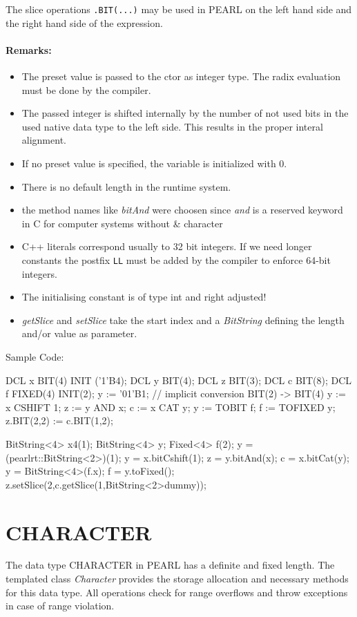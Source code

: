 The slice operations \verb|.BIT(...)| may be used in PEARL 
on the left hand side and the right hand side of the expression.
 

\paragraph{Remarks:}
\begin{itemize}
\item The preset value is passed to the ctor as integer type. The
   radix evaluation must be done by the compiler.
\item The passed integer is shifted internally by the number of not used 
   bits in the used native data type to the left side. This results
   in the proper interal alignment.
\item If no preset value is specified, the variable is initialized with 0.
\item There is no default length in the runtime system.
\item the method names like {\em bitAnd} were choosen since {\em and} 
is a reserved keyword in C for computer systems without \& character
\item C++ literals correspond usually to 32 bit integers. 
If we need longer constants the postfix \verb|LL| must be added by
the compiler to enforce 64-bit integers.
\item The initialising constant is of type int and right adjusted!
\item {\em getSlice} and {\em setSlice} take the start index and a 
    {\em BitString} defining the length and/or value as parameter.
\end{itemize}

Sample Code:
\begin{PEARLCode}
DCL x BIT(4) INIT ('1'B4);
DCL y BIT(4);
DCL z BIT(3);
DCL c BIT(8);
DCL f FIXED(4) INIT(2);
y := '01'B1;  // implicit conversion BIT(2) -> BIT(4)
y := x CSHIFT 1;
z := y AND x;
c := x CAT y;
y := TOBIT f;
f := TOFIXED y;
z.BIT(2,2)  := c.BIT(1,2);
\end{PEARLCode}

\begin{CppCode}
BitString<4> x4(1);
BitString<4> y;
Fixed<4> f(2);
y = (pearlrt::BitString<2>)(1);
y = x.bitCshift(1);
z = y.bitAnd(x);
c = x.bitCat(y);
y = BitString<4>(f.x);
f = y.toFixed();
z.setSlice(2,c.getSlice(1,BitString<2>dummy));
\end{CppCode}

\section{CHARACTER}
The data type CHARACTER in PEARL has a definite and fixed length.
The templated class {\em Character} provides the storage allocation
and necessary methods for this data type.
All operations check for range overflows and throw exceptions in case of
range violation.

